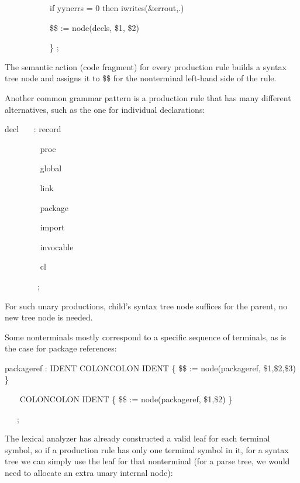 {\ttfamily\mdseries
\ \ \ \ \ \ \ \ \ \ \ if yynerrs = 0 then iwrites(\&errout,{\textquotedbl}.{\textquotedbl})}

{\ttfamily\mdseries
\ \ \ \ \ \ \ \ \ \ \ \$\$ := node({\textquotedbl}decls{\textquotedbl}, \$1, \$2)}

{\ttfamily\mdseries
\ \ \ \ \ \ \ \ \ \ \ \} ;}


The {\textquotedbl}semantic action{\textquotedbl} (code fragment) for
every production rule builds a syntax tree node and assigns it to \$\$
for the nonterminal left-hand side of the rule.

Another common grammar pattern is a production rule that has many
different alternatives, such as the one for individual declarations:

{\ttfamily\mdseries
decl \ \ \ : record}

{\ttfamily\mdseries
\ \ \ \ \ \ \ \ {\textbar} proc}

{\ttfamily\mdseries
\ \ \ \ \ \ \ \ {\textbar} global}

{\ttfamily\mdseries
\ \ \ \ \ \ \ \ {\textbar} link}

{\ttfamily\mdseries
\ \ \ \ \ \ \ \ {\textbar} package}

{\ttfamily\mdseries
\ \ \ \ \ \ \ \ {\textbar} import}

{\ttfamily\mdseries
\ \ \ \ \ \ \ \ {\textbar} invocable}

{\ttfamily\mdseries
\ \ \ \ \ \ \ \ {\textbar} cl}

{\ttfamily\mdseries
\ \ \ \ \ \ \ \ ;}


For such {\textquotedbl}unary{\textquotedbl} productions, child's
syntax tree node suffices for the parent, no new tree node is needed.

Some nonterminals mostly correspond to a specific sequence of
terminals, as is the case for package references:

{\ttfamily\mdseries
packageref : IDENT COLONCOLON IDENT \{ \$\$ := node({\textquotedbl}packageref{\textquotedbl}, \$1,\$2,\$3) \} }

{\ttfamily\mdseries
\ \ \ {\textbar} COLONCOLON IDENT \{ \$\$ := node({\textquotedbl}packageref{\textquotedbl}, \$1,\$2) \} \ }

{\ttfamily\mdseries
\ \ \ ;}


The lexical analyzer has already constructed a valid
{\textquotedbl}leaf{\textquotedbl} for each terminal symbol, so if a
production rule has only one terminal symbol in it, for a syntax tree
we can simply use the leaf for that nonterminal (for a parse tree, we
would need to allocate an extra unary internal node):

